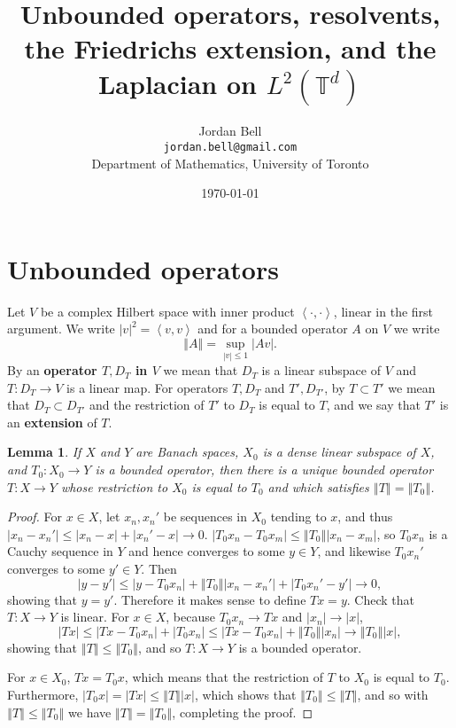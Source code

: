 \documentclass{article}
\newcommand{\inner}[2]{\left\langle #1, #2 \right\rangle}
\newcommand{\norm}[1]{\left\Vert #1 \right\Vert}
\newtheorem{lemma}[theorem]{Lemma}
\theoremstyle{definition}
\begin{document}
\title{Unbounded operators, resolvents, the Friedrichs extension, and  the Laplacian on $L^2(\mathbb{T}^d)$}
\author{Jordan Bell\\ \texttt{jordan.bell@gmail.com}\\Department of Mathematics, University of Toronto}
\date{\today}

\maketitle


\section{Unbounded operators}
\label{unbounded}
Let $V$ be a complex Hilbert space with inner product $\inner{\cdot}{\cdot}$, linear in the first argument. We write
$|v|^2 = \inner{v}{v}$ and for a bounded operator $A$ on $V$ we write
\[
\norm{A} = \sup_{|v| \leq 1} |Av|.
\]
By an \textbf{operator $T,D_T$ in $V$} we mean that $D_T$ is a linear subspace of $V$ and $T:D_T \to V$ is a linear map.
For operators $T,D_T$ and $T',D_{T'}$, by $T \subset T'$ we mean that $D_T \subset D_{T'}$ and
the restriction of $T'$ to $D_T$ is equal to $T$, and we say that $T'$ is an \textbf{extension}
of $T$.

\begin{lemma}
If $X$ and $Y$ are Banach spaces, $X_0$ is a dense linear subspace of $X$, and $T_0:X_0 \to Y$ is a bounded
operator, then there is a unique bounded operator $T:X \to Y$ whose restriction to $X_0$ is equal to $T_0$ and which
satisfies $\norm{T}=\norm{T_0}$.
\label{extension}
\end{lemma}
\begin{proof}
For $x \in X$,
let $x_n,x_n'$ be sequences in $X_0$ tending to $x$, and thus
$|x_n-x_n'| \leq |x_n-x|+|x_n'-x| \to 0$.
 $|T_0x_n-T_0x_m| \leq \norm{T_0} |x_n-x_m|$, so 
$T_0x_n$ is a Cauchy sequence in $Y$ and hence converges to some 
$y \in Y$, and likewise $T_0x_n'$ converges to some $y' \in Y$.
 Then
 \[
 |y-y'|  \leq |y-T_0x_n| + \norm{T_0}|x_n-x_n'| + |T_0x_n'-y'| \to 0,
 \]
 showing that $y=y'$. Therefore it makes sense to define $Tx=y$. 
Check that $T:X \to Y$ is linear. For $x \in X$, because $T_0x_n \to Tx$ and $|x_n| \to |x|$,
\[
|Tx| \leq |Tx-T_0x_n| + |T_0x_n| \leq |Tx-T_0x_n| + \norm{T_0} |x_n|
\to \norm{T_0} |x|,
\]
showing that $\norm{T} \leq \norm{T_0}$, and so $T:X \to Y$ is a bounded operator.

For $x \in X_0$, $Tx=T_0x$, which means that the restriction of $T$ to $X_0$ is equal to $T_0$. Furthermore,
$|T_0x| = |Tx| \leq \norm{T} |x|$, which shows that $\norm{T_0} \leq \norm{T}$, and so with $\norm{T} \leq \norm{T_0}$
we have $\norm{T}=\norm{T_0}$, completing the proof. 
\end{proof}
\end{document}
